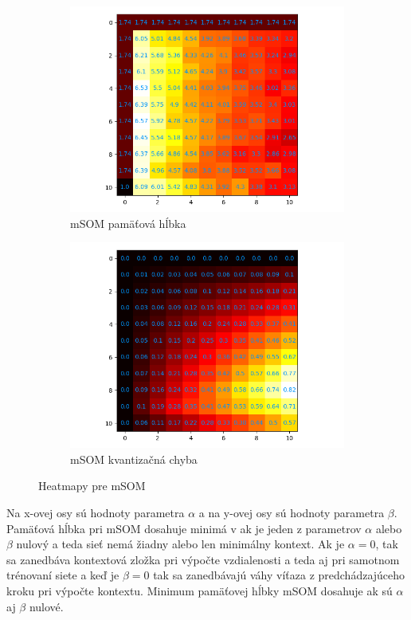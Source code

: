 \begin{figure}[H]
    \centering
    \begin{subfigure}{.5\textwidth}
        \centering
        \includegraphics[width=\linewidth]{assets/msom_memory_span}
        \caption{mSOM pamäťová hĺbka}
        \label{fig:sub1}
    \end{subfigure}%
    \begin{subfigure}{.5\textwidth}
        \centering
        \includegraphics[width=\linewidth]{assets/msom_quantization_errors}
        \caption{mSOM kvantizačná chyba}
        \label{fig:sub2}
    \end{subfigure}
    \caption{Heatmapy pre mSOM}
    \label{fig:test}
\end{figure}
 Na x-ovej osy sú hodnoty parametra $\alpha$ a na y-ovej osy sú hodnoty parametra $\beta$. 
 Pamäťová hĺbka pri mSOM dosahuje minimá v ak je jeden z parametrov $\alpha$ alebo $\beta$ nulový a teda sieť nemá
 žiadny alebo len minimálny kontext. Ak je $\alpha = 0$, tak sa zanedbáva kontextová zložka pri výpočte vzdialenosti a 
 teda aj pri samotnom trénovaní siete a keď je $\beta = 0$ tak sa zanedbávajú váhy víťaza z predchádzajúceho kroku pri výpočte kontextu.
 Minimum pamäťovej hĺbky mSOM dosahuje ak sú $\alpha$ aj $\beta$ nulové.

